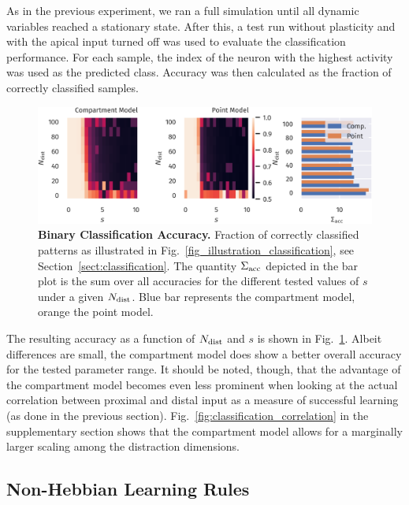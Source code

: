 \documentclass[utf8]{frontiersSCNS} %
\begin{document}
As in the previous experiment, we ran a full simulation until 
all dynamic variables reached a stationary state. After this,
a test run without plasticity and with the apical input turned off 
was used to evaluate the classification	performance. 
For each sample, the index of the neuron with the highest 
activity was used as the predicted class. 
Accuracy was then calculated as the fraction
of correctly classified samples.
\begin{figure}[t]
\centering
\includegraphics[width=1.0\columnwidth]{classification_dimension_scaling_high_input_dim}
\caption{{\bf Binary Classification Accuracy.}
	Fraction of correctly classified patterns as illustrated in
	Fig.~\ref{fig_illustration_classification}, see 
	Section~\ref{sect:classification}. The quantity $\Sigma_{\rm acc}$ depicted in the bar
	plot is the sum over all accuracies for the different tested values
	of $s$ under a given $N_{\rm dist}$. Blue bar represents the compartment model,
	orange the point model.}
\label{fig:classification_accuracy}
\end{figure}

The resulting accuracy as a function of $N_{\rm dist}$ and $s$
is shown in Fig.~\ref{fig:classification_accuracy}.
Albeit differences are small, the compartment model does
show a better overall accuracy for the tested parameter range.
It should be noted, though, that the advantage of the compartment
model becomes even less prominent when looking at the actual
correlation between proximal and distal input as a
measure of successful learning (as done in the previous section).
Fig.~\ref{fig:classification_correlation} in the supplementary 
section shows that the compartment model allows for a marginally
larger scaling among the distraction dimensions.
\\
\subsection{Non-Hebbian Learning Rules}
\label{sect:non-hebbian}
\end{document}
